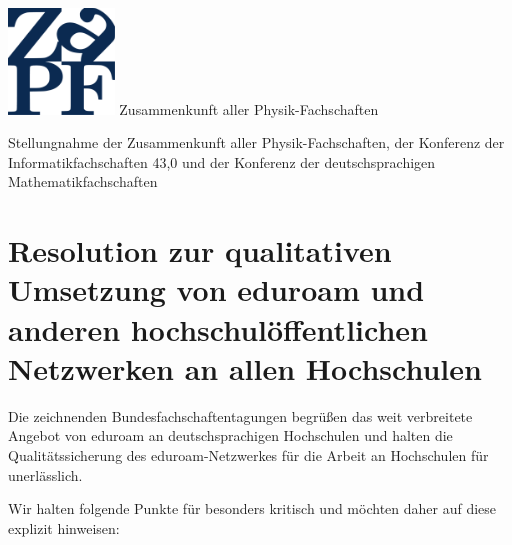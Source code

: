 \documentclass[DIV=calc]{scrartcl}
\begin{document}
\begin{adjustbox}{center}
\begin{minipage}{1.2\textwidth}
\begin{minipage}[c]{0.25\textwidth}
	\end{minipage}
	\hfill
	\begin{minipage}{4cm}
		\begin{minipage}{120pt}
			\vspace{-1.8cm}
			\includegraphics[width=80pt]{../../logo.pdf}
			\centering
			\small Zusammenkunft aller Physik-Fachschaften
		\end{minipage}
	\end{minipage}
\end{minipage}
\end{adjustbox}
\vspace{0.3cm}
\begin{center}
\huge{Stellungnahme der Zusammenkunft aller Physik-Fachschaften, der Konferenz
der Informatikfachschaften 43,0 und der Konferenz der deutschsprachigen Mathematikfachschaften} \\
\normalsize
\end{center}

\section*{Resolution zur qualitativen Umsetzung von  eduroam und anderen
hochschulöffentlichen Netzwerken an allen Hochschulen}

Die zeichnenden Bundesfachschaftentagungen begrüßen das weit verbreitete
Angebot von eduroam an deutschsprachigen Hochschulen und halten die
Qualitätssicherung des eduroam-Netzwerkes für die Arbeit an Hochschulen für
unerlässlich.

Wir halten folgende Punkte für besonders kritisch und möchten daher auf diese
explizit hinweisen:
\end{document}
